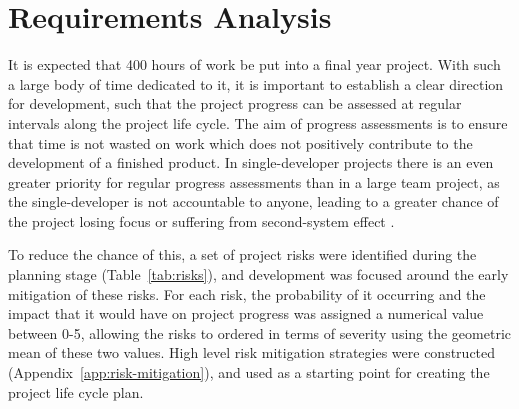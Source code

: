 \chapter{Requirements Analysis}\label{chap:requirements}

It is expected that 400 hours of work be put into a final year
project. With such a large body of time dedicated to it, it is
important to establish a clear direction for development, such that
the project progress can be assessed at regular intervals along the
project life cycle. The aim of progress assessments is to ensure that
time is not wasted on work which does not positively contribute to the
development of a finished product. In single-developer projects there
is an even greater priority for regular progress assessments than in a
large team project, as the single-developer is not accountable to
anyone, leading to a greater chance of the project losing focus or
suffering from second-system effect \cite{brooks1995mythical}.

To reduce the chance of this, a set of project risks were identified
during the planning stage (Table~\ref{tab:risks}), and development was
focused around the early mitigation of these risks. For each risk, the
probability of it occurring and the impact that it would have on
project progress was assigned a numerical value between 0-5, allowing
the risks to ordered in terms of severity using the geometric mean of
these two values. High level risk mitigation strategies were
constructed (Appendix~\ref{app:risk-mitigation}), and used as a
starting point for creating the project life cycle plan.


